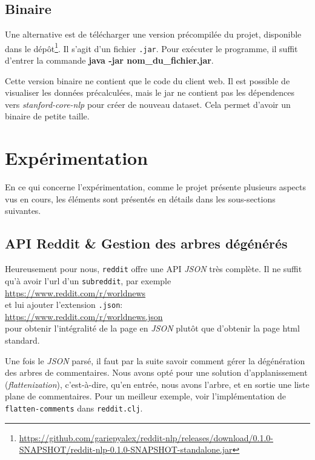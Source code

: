 \documentclass[12pt]{article}
\begin{document}
\subsection{Binaire}
Une alternative est de télécharger une version précompilée du projet, disponible dans le dépôt\footnote{\url{https://github.com/gariepyalex/reddit-nlp/releases/download/0.1.0-SNAPSHOT/reddit-nlp-0.1.0-SNAPSHOT-standalone.jar}}. Il s'agit d'un fichier \verb;.jar;. Pour exécuter le programme, il
suffit d'entrer la commande \textbf{java -jar nom\_du\_fichier.jar}.

Cette version binaire ne contient que le code du client web. Il est possible de visualiser les données précalculées, mais le jar ne contient pas les dépendences
vers \emph{stanford-core-nlp} pour créer de nouveau dataset. Cela permet d'avoir un binaire de petite taille.

\section{Expérimentation}

En ce qui concerne l'expérimentation, comme le projet présente plusieurs aspects vus en cours, les éléments sont présentés en détails dans les sous-sections suivantes.

\subsection{API Reddit \& Gestion des arbres dégénérés}
\label{sec:api-reddit}

Heureusement pour nous, \verb;reddit; offre une API \textit{JSON} très complète. Il ne suffit qu'à avoir l'url d'un \verb;subreddit;, par exemple\\

\url{https://www.reddit.com/r/worldnews}\\

et lui ajouter l'extension \verb;.json;:\\

\url{https://www.reddit.com/r/worldnews.json}\\

pour obtenir l'intégralité de la page en \textit{JSON} plutôt que d'obtenir la page html standard.

Une fois le \textit{JSON} parsé, il faut par la suite savoir comment gérer la dégénération des arbres de commentaires. Nous avons opté pour une solution d'applanissement (\textit{flattenization}), c'est-à-dire, qu'en entrée, nous avons l'arbre, et en sortie une liste plane de commentaires. Pour un meilleur exemple, voir l'implémentation de \verb;flatten-comments; dans \verb;reddit.clj;.
\end{document}
